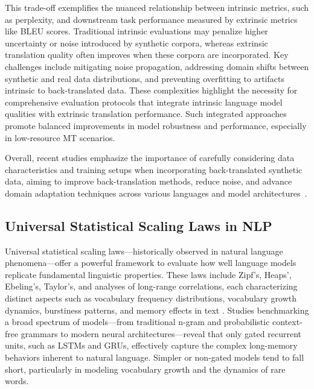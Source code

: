 \documentclass[sigconf]{acmart}
\begin{document}
This trade-off exemplifies the nuanced relationship between intrinsic metrics, such as perplexity, and downstream task performance measured by extrinsic metrics like BLEU scores. Traditional intrinsic evaluations may penalize higher uncertainty or noise introduced by synthetic corpora, whereas extrinsic translation quality often improves when these corpora are incorporated. Key challenges include mitigating noise propagation, addressing domain shifts between synthetic and real data distributions, and preventing overfitting to artifacts intrinsic to back-translated data. These complexities highlight the necessity for comprehensive evaluation protocols that integrate intrinsic language model qualities with extrinsic translation performance. Such integrated approaches promote balanced improvements in model robustness and performance, especially in low-resource MT scenarios.

\noindent Overall, recent studies emphasize the importance of carefully considering data characteristics and training setups when incorporating back-translated synthetic data, aiming to improve back-translation methods, reduce noise, and advance domain adaptation techniques across various languages and model architectures~\cite{ref37}.

\subsection{Universal Statistical Scaling Laws in NLP}

Universal statistical scaling laws—historically observed in natural language phenomena—offer a powerful framework to evaluate how well language models replicate fundamental linguistic properties. These laws include Zipf’s, Heaps’, Ebeling’s, Taylor’s, and analyses of long-range correlations, each characterizing distinct aspects such as vocabulary frequency distributions, vocabulary growth dynamics, burstiness patterns, and memory effects in text \cite{ref51}. Studies benchmarking a broad spectrum of models—from traditional n-gram and probabilistic context-free grammars to modern neural architectures—reveal that only gated recurrent units, such as LSTMs and GRUs, effectively capture the complex long-memory behaviors inherent to natural language. Simpler or non-gated models tend to fall short, particularly in modeling vocabulary growth and the dynamics of rare words.
\end{document}
